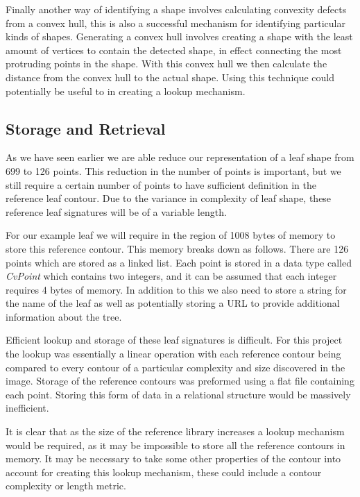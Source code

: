 Finally another way of identifying a shape involves calculating convexity defects from a convex hull, this is also a successful mechanism for identifying particular kinds of shapes. Generating a convex hull involves creating a shape with the least amount of vertices to contain the detected shape, in effect connecting the most protruding points in the shape. With this convex hull we then calculate the distance from the convex hull to the actual shape. Using this technique could potentially be useful to in creating a lookup mechanism.

\subsection{Storage and Retrieval}
As we have seen earlier we are able reduce our representation of a leaf shape from 699 to 126 points. This reduction in the number of points is important, but we still require a certain number of points to have sufficient definition in the reference leaf contour. Due to the variance in complexity of leaf shape, these reference leaf signatures will be of a variable length.

For our example leaf we will require in the region of 1008 bytes of memory to store this reference contour. This memory breaks down as follows. There are 126 points which are stored as a linked list. Each point is stored in a data type called \emph{CvPoint} which contains two integers, and it can be assumed that each integer requires 4 bytes of memory. In addition to this we also need to store a string for the name of the leaf as well as potentially storing a URL to provide additional information about the tree.

Efficient lookup and storage of these leaf signatures is difficult. For this project the lookup was essentially a linear operation with each reference contour being compared to every contour of a particular complexity and size discovered in the image. Storage of the reference contours was preformed using a flat file containing each point. Storing this form of data in a relational structure would be massively inefficient.

It is clear that as the size of the reference library increases a lookup mechanism would be required, as it may be impossible to store all the reference contours in memory. It may be necessary to take some other properties of the contour into account for creating this lookup mechanism, these could include a contour complexity or length metric. 


